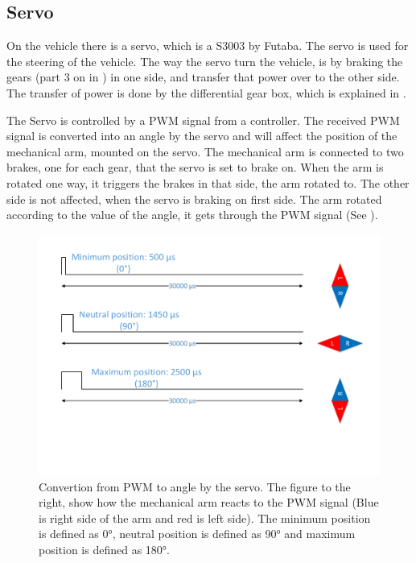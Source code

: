 \subsection{Servo}
On the vehicle there is a servo, which is a S3003 by Futaba. 
The servo is used for the steering of the vehicle. The way the servo turn the vehicle, is by braking the gears (part 3 on  in ) in one side, and transfer that power over to the other side. The transfer of power is done by the differential gear box, which is explained in .

The Servo is controlled by a PWM signal from a controller. The received PWM signal is converted into an angle by the servo and will affect the position of the mechanical arm, mounted on the servo. The mechanical arm is connected to two brakes, one for each gear, that the servo is set to brake on. When the arm is rotated one way, it triggers the brakes in that side, the arm rotated to. The other side is not affected, when the servo is braking on first side. The arm rotated according to the value of the angle, it gets through the PWM signal (See ).

\begin{figure}[H]
	\centering
	\includegraphics[scale=0.6]{figures/TimeVSangle.pdf}
	\caption{Convertion from PWM to angle by the servo. The figure to the right, show how the mechanical arm reacts to the PWM signal (Blue is right side of the arm and red is left side). The minimum position is defined as 0°, neutral position is defined as 90° and maximum position is defined as 180°.}
	\label{timeVSangle}
\end{figure}

